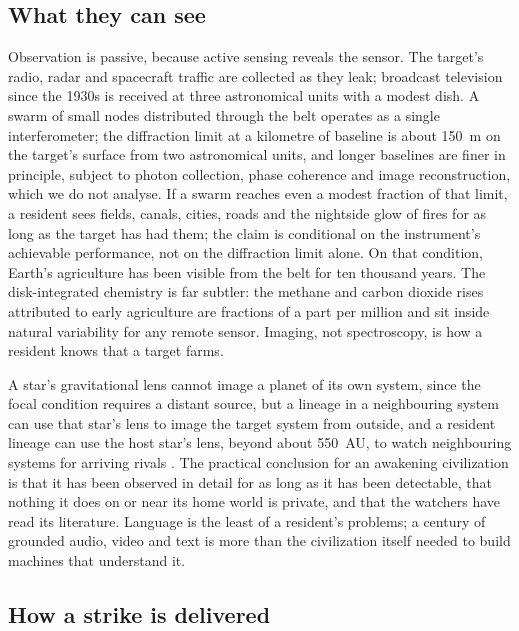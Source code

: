 \documentclass[preprint,12pt]{elsarticle}
\theoremstyle{definition}
\begin{document}
\subsection{What they can see}
\label{sec:see}

Observation is passive, because active sensing reveals the sensor. The target's radio, radar and spacecraft traffic are collected as they leak; broadcast television since the 1930s is received at three astronomical units with a modest dish. A swarm of small nodes distributed through the belt operates as a single interferometer; the diffraction limit at a kilometre of baseline is about 150~m on the target's surface from two astronomical units, and longer baselines are finer in principle, subject to photon collection, phase coherence and image reconstruction, which we do not analyse. If a swarm reaches even a modest fraction of that limit, a resident sees fields, canals, cities, roads and the nightside glow of fires for as long as the target has had them; the claim is conditional on the instrument's achievable performance, not on the diffraction limit alone. On that condition, Earth's agriculture has been visible from the belt for ten thousand years. The disk-integrated chemistry is far subtler: the methane and carbon dioxide rises attributed to early agriculture \citep{Ruddiman2003} are fractions of a part per million and sit inside natural variability for any remote sensor. Imaging, not spectroscopy, is how a resident knows that a target farms.

A star's gravitational lens cannot image a planet of its own system, since the focal condition requires a distant source, but a lineage in a neighbouring system can use that star's lens to image the target system from outside, and a resident lineage can use the host star's lens, beyond about 550~AU, to watch neighbouring systems for arriving rivals \citep{TuryshevToth2017}. The practical conclusion for an awakening civilization is that it has been observed in detail for as long as it has been detectable, that nothing it does on or near its home world is private, and that the watchers have read its literature. Language is the least of a resident's problems; a century of grounded audio, video and text is more than the civilization itself needed to build machines that understand it.

\subsection{How a strike is delivered}
\label{sec:strike}
\end{document}
